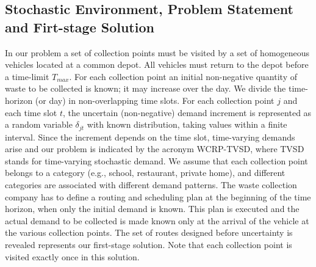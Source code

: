 \documentclass[preprint,11pt,authoryear]{elsarticle}
\begin{document}
\subsection{Stochastic Environment, Problem Statement and Firt-stage Solution}
In our problem a set of collection points must be visited by a set of homogeneous vehicles located at a common depot. 
All vehicles must return to the depot before a time-limit $T_{max}$. 
For each collection point an initial non-negative quantity of waste to be collected is known; it may increase over the day. We divide the time-horizon (or day) in non-overlapping time slots. For each collection point $j$ and each time slot $t$, the uncertain (non-negative) demand increment is represented as a random variable $\delta_{jt}$ with known distribution, taking values within a finite interval. Since the increment depends on the time slot, time-varying demands arise and our problem is indicated by the acronym WCRP-TVSD, where TVSD stands for time-varying stochastic demand. 
We assume that each collection point belongs to a category (e.g., school, restaurant, private home), and different categories are associated with different demand patterns. The waste collection company has to define a routing and scheduling plan at the beginning of the time horizon, when only the initial demand is known. This plan is executed and the actual demand to be collected is made known only at the arrival of the vehicle at the various collection points. The set of routes designed before uncertainty is revealed represents our first-stage solution. Note that each collection point is visited exactly once in this solution. 
\end{document}
